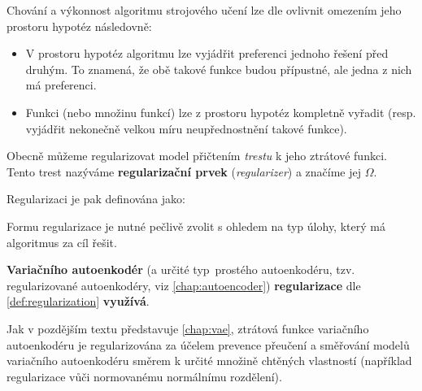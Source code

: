 Chování a výkonnost algoritmu strojového učení lze dle \textcite{Goodfellow2016} ovlivnit omezením jeho prostoru hypotéz následovně:
\begin{itemize}
    \item V prostoru hypotéz algoritmu lze vyjádřit preferenci jednoho řešení před druhým. To znamená, že obě takové funkce budou přípustné, ale jedna z nich má preferenci.
    \item Funkci (nebo množinu funkcí) lze z prostoru hypotéz kompletně vyřadit (resp. vyjádřit nekonečně velkou míru neupřednostnění takové funkce).
\end{itemize}

Obecně můžeme regularizovat model přičtením \emph{trestu} k jeho ztrátové funkci. Tento trest nazýváme \textbf{regularizační prvek} (\emph{regularizer}) a značíme jej $\Omega$.

Regularizaci je pak definována jako:
\begin{definition}[Regularizace]
    \label{def:regularization}
     \cite{Goodfellow2016}
\end{definition}

Formu regularizace je nutné pečlivě zvolit s ohledem na typ úlohy, který má algoritmus za cíl řešit.

\textbf{Variačního autoenkodér} (a určité typ\ prostého autoenkodéru, tzv. regularizované autoenkodéry, viz \autoref{chap:autoencoder}) \textbf{regularizace} dle \autoref{def:regularization} \textbf{využívá}.

Jak v pozdějším textu představuje \autoref{chap:vae}, ztrátová funkce variačního autoenkodéru je regularizována za účelem prevence přeučení a směřování modelů variačního autoenkodéru směrem k určité množině chtěných vlastností (například regularizace vůči normovanému normálnímu rozdělení). \cite{Kingma2014}








